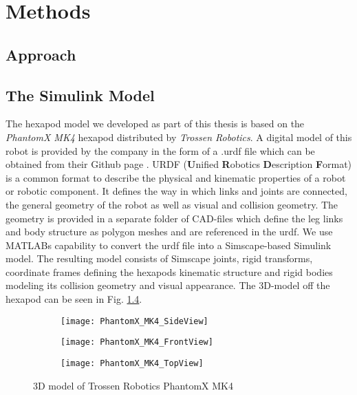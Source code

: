 \chapter{Methods}
\label{ch:methods}

\section{Approach}

\section{The Simulink Model}
The hexapod model we developed as part of this thesis is based on the \textit{PhantomX MK4} hexapod distributed by \textit{Trossen Robotics}.
A digital model of this robot is provided by the company in the form of a .urdf file which can be obtained from their Github page \parencite{interboticsGithub}.
URDF (\textbf{U}nified \textbf{R}obotics \textbf{D}escription \textbf{F}ormat) is a common format to describe the physical and kinematic properties of a robot or robotic component. 
It defines the way in which links and joints are connected, the general geometry of the robot as well as visual and collision geometry.
The geometry is provided in a separate folder of CAD-files which define the leg links and body structure as 
polygon meshes and are referenced in the urdf.
We use MATLABs capability to convert the urdf file into a Simscape-based Simulink model.
The resulting model consists of Simscape joints, rigid transforms, coordinate frames defining the hexapods kinematic structure and rigid bodies modeling its collision geometry and visual appearance.
The 3D-model off the hexapod can be seen in Fig. \ref{figure: PhantomX 3D model}.

\begin{figure}[h]
	\begin{subfigure}{.5\textwidth} %
		\centering
		\texttt{[image: PhantomX\_MK4\_SideView]}  %
		\caption{}
		\label{figure: PhantomX Side View}
	\end{subfigure}
	\begin{subfigure}{.5\textwidth}
		\centering
		\texttt{[image: PhantomX\_MK4\_FrontView]}  
		\caption{}
		\label{figure: PhantomX Front View}
	\end{subfigure}
	
	\label{fig:fig}
	\begin{subfigure}{\textwidth}
		\centering
		\texttt{[image: PhantomX\_MK4\_TopView]}   %
		\caption{}
		\label{figure: PhantomX Top View}
	\end{subfigure}
	\caption[]{3D model of Trossen Robotics PhantomX MK4}
	\label{figure: PhantomX 3D model}
\end{figure}

